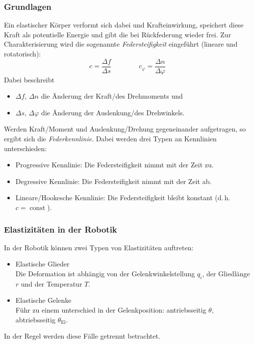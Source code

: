 \documentclass[a4paper, 11pt, accentcolor = tud3b]{tudreport}
\DeclareMathOperator{\const}{const}
\renewcommand{\dh}{d.\,h.~}
\begin{document}
				\subsubsection{Grundlagen}
					Ein elastischer Körper verformt sich dabei und Krafteinwirkung, speichert diese Kraft als potentielle Energie und gibt die bei Rückfederung wieder frei. Zur Charakterisierung wird die sogenannte \emph{Federsteifigkeit} eingeführt (lineare und rotatorisch):
					\begin{equation*}
						c = \frac{\Delta f}{\Delta s} \quad\quad\quad\quad c_\varphi = \frac{\Delta n}{\Delta \varphi}
					\end{equation*}
					Dabei beschreibt
					\begin{itemize}
						\item \( \Delta f \), \( \Delta n \) die Änderung der Kraft/des Drehmoments und
						\item \( \Delta s \), \( \Delta \varphi \) die Änderung der Auslenkung/des Drehwinkels.
					\end{itemize}
					Werden Kraft/Moment und Auslenkung/Drehung gegeneinander aufgetragen, so ergibt sich die \emph{Federkennlinie}. Dabei werden drei Typen an Kennlinien unterschieden:
					\begin{itemize}
						\item Progressive Kennlinie: Die Federsteifigkeit nimmt mit der Zeit zu.
						\item Degressive Kennlinie: Die Federsteifigkeit nimmt mit der Zeit ab.
						\item Lineare/Hookesche Kennlinie: Die Federsteifigkeit bleibt konstant (\dh \( c = \const \)).
					\end{itemize}

				\subsubsection{Elastizitäten in der Robotik} %
					In der Robotik können zwei Typen von Elastizitäten auftreten:
					\begin{itemize}
						\item Elastische Glieder \\ Die Deformation ist abhängig von der Gelenkwinkelstellung \(q_i\), der Gliedlänge \(r\) und der Temperatur \(T\).
						\item Elastische Gelenke \\ Führ zu einem unterschied in der Gelenkposition: antriebsseitig \(\theta\), abtriebsseitig \(\theta_\text{El}\).
					\end{itemize}
					In der Regel werden diese Fälle getrennt betrachtet.
\end{document}
